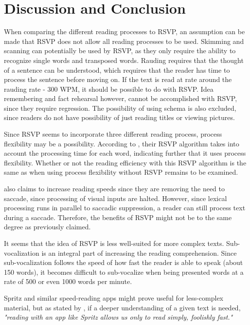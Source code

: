 \section{Discussion and Conclusion}
When comparing the different reading processes to RSVP, an assumption can be made that RSVP does not allow all reading processes to be used. Skimming and scanning can potentially be used by RSVP, as they only require the ability to recognize single words and transposed words. Rauding requires that the thought of a sentence can be understood, which requires that the reader has time to process the sentence before moving on. If the text is read at rate around the rauding rate - 300 WPM, it should be possible to do with RSVP.   Idea remembering and fact rehearsal however, cannot be accomplished with RSVP, since they require regression. The possibility of using schema is also excluded, since readers do not have possibility of just reading titles or viewing pictures.

Since RSVP seems to incorporate three different reading process, process flexibility may be a possibility. According to , their RSVP algorithm takes into account the processing time for each word, indicating further that it uses process flexibility. Whether or not the reading efficiency with this RSVP algorithm is the same as when using process flexibility without RSVP remains to be examined.

 also claims to increase reading speeds since they are removing the need to saccade, since processing of visual inputs are halted. However, since lexical processing runs in parallel 
to saccadic suppression, a reader can still process text during a saccade. Therefore, the benefits of RSVP might not be to the same degree as previously claimed.

It seems that the idea of RSVP is less well-suited for more complex texts. Sub-vocalization is an integral part of increasing the reading comprehension. Since sub-vocalization follows the speed of how fast the reader is able to speak (about 150 words), it becomes difficult to sub-vocalize when being presented words at a rate of 500 or even 1000 words per minute. 

Spritz and similar speed-reading apps might prove useful for less-complex material, but as stated by , if a deeper understanding of a given text is needed, \emph{"reading with an app like Spritz allows us only to read simply, foolishly fast."}

